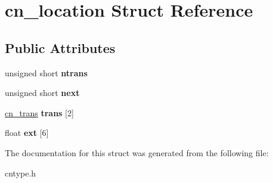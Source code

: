 \hypertarget{structcn__location}{\section{cn\-\_\-location Struct Reference}
\label{structcn__location}
}
\subsection*{Public Attributes}
\begin{DoxyCompactItemize}
\item 
\hypertarget{structcn__location_a36ac1f8e3d8b177573b4e3edb6279f0f}{unsigned short {\bfseries ntrans}}\label{structcn__location_a36ac1f8e3d8b177573b4e3edb6279f0f}

\item 
\hypertarget{structcn__location_a98687f68bc667bebc2139ce70be6b827}{unsigned short {\bfseries next}}\label{structcn__location_a98687f68bc667bebc2139ce70be6b827}

\item 
\hypertarget{structcn__location_a51be50c94511b8bde3ded041ac5a13a0}{\hyperlink{structcn__trans}{cn\-\_\-trans} {\bfseries trans} \mbox{[}2\mbox{]}}\label{structcn__location_a51be50c94511b8bde3ded041ac5a13a0}

\item 
\hypertarget{structcn__location_a470c0b89a53058fe2bc7b6204be9171e}{float {\bfseries ext} \mbox{[}6\mbox{]}}\label{structcn__location_a470c0b89a53058fe2bc7b6204be9171e}

\end{DoxyCompactItemize}


The documentation for this struct was generated from the following file\-:\begin{DoxyCompactItemize}
\item 
cntype.\-h\end{DoxyCompactItemize}
